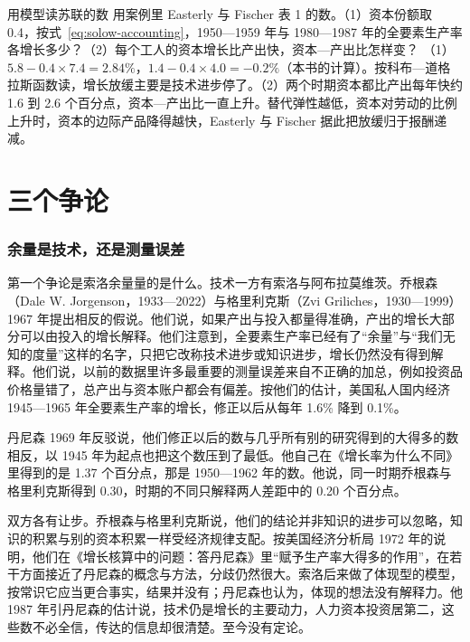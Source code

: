\begin{example}{用模型读苏联的数}\label{ex:solow-soviet}
用案例里 Easterly 与 Fischer 表 1 的数\cite{ef1995}。（1）资本份额取 0.4，按式~\eqref{eq:solow-accounting}，1950—1959 年与 1980—1987 年的全要素生产率各增长多少？（2）每个工人的资本增长比产出快，资本—产出比怎样变？
\solution
（1）$5.8-0.4\times7.4=2.84\%$，$1.4-0.4\times4.0=-0.2\%$（本书的计算）。按科布—道格拉斯函数读，增长放缓主要是技术进步停了。（2）两个时期资本都比产出每年快约 1.6 到 2.6 个百分点，资本—产出比一直上升。替代弹性越低，资本对劳动的比例上升时，资本的边际产品降得越快，Easterly 与 Fischer 据此把放缓归于报酬递减\cite{ef1995}。
\end{example}

\section{三个争论}\label{sec:solow-debate}

\subsubsection{余量是技术，还是测量误差}

第一个争论是索洛余量量的是什么。技术一方有索洛与阿布拉莫维茨。乔根森（Dale W. Jorgenson，1933—2022）与格里利克斯（Zvi Griliches，1930—1999）1967 年提出相反的假说\cite{jg1967,loc39,gnd39,loc40,gnd40}。他们说，如果产出与投入都量得准确，产出的增长大部分可以由投入的增长解释\cite{jg1967}。他们注意到，全要素生产率已经有了“余量”与“我们无知的度量”这样的名字，只把它改称技术进步或知识进步，增长仍然没有得到解释\cite{jg1967}。他们说，以前的数据里许多最重要的测量误差来自不正确的加总，例如投资品价格量错了，总产出与资本账户都会有偏差\cite{jg1967}。按他们的估计，美国私人国内经济 1945—1965 年全要素生产率的增长，修正以后从每年 1.6\% 降到 0.1\%\cite{jg1967}。

丹尼森 1969 年反驳说，他们修正以后的数与几乎所有别的研究得到的大得多的数相反，以 1945 年为起点也把这个数压到了最低\cite{denison1969}。他自己在《增长率为什么不同》里得到的是 1.37 个百分点，那是 1950—1962 年的数\cite{denison1969}。他说，同一时期乔根森与格里利克斯得到 0.30，时期的不同只解释两人差距中的 0.20 个百分点\cite{denison1969}。

双方各有让步。乔根森与格里利克斯说，他们的结论并非知识的进步可以忽略，知识的积累与别的资本积累一样受经济规律支配\cite{jg1967}。按美国经济分析局 1972 年的说明，他们在《增长核算中的问题：答丹尼森》里“赋予生产率大得多的作用”，在若干方面接近了丹尼森的概念与方法，分歧仍然很大\cite{scb1972}。索洛后来做了体现型的模型，按常识它应当更合事实，结果并没有；丹尼森也认为，体现的想法没有解释力\cite{solow1987}。他 1987 年引丹尼森的估计说，技术仍是增长的主要动力，人力资本投资居第二，这些数不必全信，传达的信息却很清楚\cite{solow1987}。至今没有定论。

